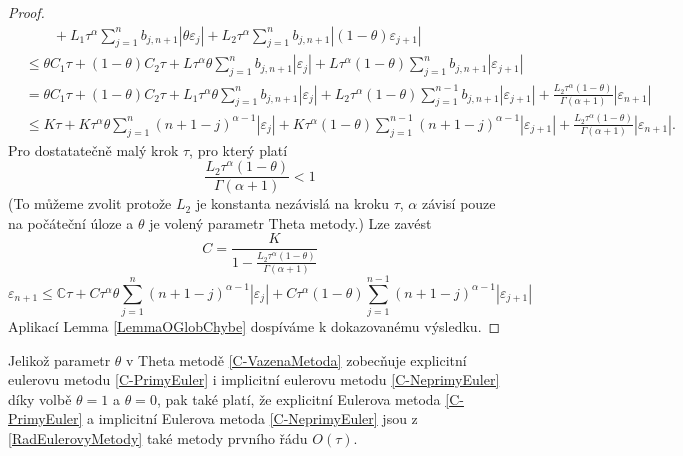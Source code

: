 \documentclass[a4paper,12pt,twoside]{article}
\theoremstyle{definition}
\theoremstyle{remark}
\numberwithin{equation}{section}
\numberwithin{table}{section}
\numberwithin{figure}{section}
\newcommand{\C}{\mathbb{C}}
\begin{document}
\begin{proof}
\begin{equation}
\begin{aligned}
			& \qquad + L_{1}\tau^{\alpha} \sum_{j = 1}^{n} 	b_{j,n+1}  | \theta \varepsilon_{j}| + L_{2}\tau^{\alpha} \sum_{j = 1}^{n} 	b_{j,n+1} |\left(1-\theta \right) \varepsilon_{j+1}| \\
			&\leq \theta C_{1} \tau + \left(1-\theta \right) C_{2} \tau + L \tau^{\alpha}\theta \sum_{j = 1}^{n} 	b_{j,n+1} | \varepsilon_{j}| + L \tau^{\alpha}\left(1-\theta \right) \sum_{j = 1}^{n} 	b_{j,n+1} | \varepsilon_{j+1}| \\
			& = \theta C_{1} \tau + \left(1-\theta \right) C_{2} \tau + L_{1} \tau^{\alpha}\theta \sum_{j = 1}^{n} 	b_{j,n+1} | \varepsilon_{j}| + L_{2} \tau^{\alpha}\left(1-\theta \right) \sum_{j = 1}^{n-1} 	b_{j,n+1} | \varepsilon_{j+1}| +  \frac{L_{2}\tau^{\alpha}\left(1-\theta\right)}{\Gamma\left(\alpha+1\right)} |\varepsilon_{n+1}|\\
			&\leq K \tau + K \tau^{\alpha}\theta \sum_{j = 1}^{n} 	\left(n+1-j\right)^{\alpha - 1} | \varepsilon_{j}| + K \tau^{\alpha}\left(1-\theta \right) \sum_{j = 1}^{n-1} 	\left(n+1-j\right)^{\alpha - 1} | \varepsilon_{j+1}| +\frac{L_{2}\tau^{\alpha}\left(1-\theta\right)}{\Gamma\left(\alpha+1\right)} |\varepsilon_{n+1}|.
		\end{aligned}	
	\end{equation}
	Pro dostatatečně malý krok $\tau$, pro který platí
	\begin{equation}
		\frac{L_{2}\tau^{\alpha}\left(1-\theta\right)}{\Gamma\left(\alpha+1\right)} < 1
	\end{equation}
	(To můžeme zvolit protože $L_{2}$ je konstanta nezávislá na kroku $\tau$, $\alpha$ závisí pouze na počáteční úloze a $\theta$  je volený parametr Theta metody.)
	Lze zavést
	$$C = \frac{K}{1 - \frac{L_{2}\tau^{\alpha}\left(1-\theta\right)}{ \Gamma\left(\alpha+1\right)}}$$
	\begin{equation}
		\varepsilon_{n+1} \leq \C \tau + C \tau^{\alpha}\theta \sum_{j = 1}^{n} 	\left(n+1-j\right)^{\alpha - 1} | \varepsilon_{j}| + C \tau^{\alpha}\left(1-\theta \right) \sum_{j = 1}^{n-1} 	\left(n+1-j\right)^{\alpha - 1} | \varepsilon_{j+1}|
	\end{equation}
	Aplikací Lemma \ref{LemmaOGlobChybe} dospíváme k dokazovanému výsledku. 
\end{proof}

Jelikož parametr $\theta$ v Theta metodě \eqref{C-VazenaMetoda} zobecňuje explicitní eulerovu metodu \eqref{C-PrimyEuler} i implicitní eulerovu metodu \eqref{C-NeprimyEuler} díky volbě $\theta = 1$ a $\theta = 0$, pak také platí, že explicitní Eulerova metoda \eqref{C-PrimyEuler} a implicitní Eulerova metoda \eqref{C-NeprimyEuler} jsou z \ref{RadEulerovyMetody} také metody prvního řádu $O\left(\tau\right)$.
\end{document}
